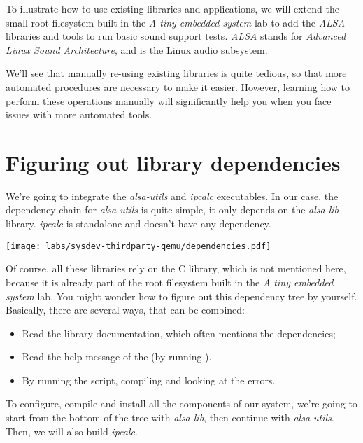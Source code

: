 
To illustrate how to use existing libraries and applications, we will
extend the small root filesystem built in the {\em A tiny embedded
system} lab to add the {\em ALSA} libraries and tools to run
basic sound support tests. {\em ALSA} stands for {\em Advanced Linux
Sound Architecture}, and is the Linux audio subsystem.

We'll see that manually re-using existing libraries is quite tedious,
so that more automated procedures are necessary to make it
easier. However, learning how to perform these operations manually
will significantly help you when you face issues with more
automated tools.

\section{Figuring out library dependencies}

We're going to integrate the {\em alsa-utils}
and {\em ipcalc} executables. In our case, the dependency chain
for {\em alsa-utils} is quite simple, it only depends on the
{\em alsa-lib} library. {\em ipcalc} is standalone
and doesn't have any dependency.

\texttt{[image: labs/sysdev-thirdparty-qemu/dependencies.pdf]}

Of course, all these libraries rely on the C library, which is not
mentioned here, because it is already part of the root filesystem
built in the {\em A tiny embedded system} lab. You might wonder how to
figure out this dependency tree by yourself. Basically, there are
several ways, that can be combined:

\begin{itemize}
\item Read the library documentation, which often mentions the
  dependencies;
\item Read the help message of the  (by running
  ).
\item By running the  script, compiling and looking
  at the errors.
\end{itemize}

To configure, compile and install all the components of our system,
we're going to start from the bottom of the tree with {\em alsa-lib},
then continue with {\em alsa-utils}. Then, we will also build
{\em ipcalc}.

